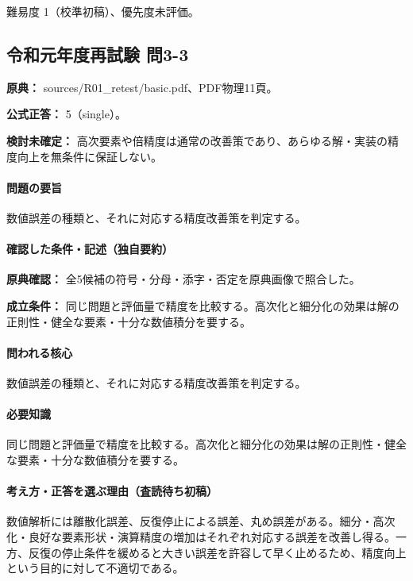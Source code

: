 \par 難易度 1（校準初稿）、優先度未評価。

\subsection{令和元年度再試験 問3-3}
\label{q:r01-ret-basic-3-3}

\noindent\textbf{原典：} sources/R01\_retest/basic.pdf、PDF物理11頁。

\textbf{公式正答：} 5（single）。

\par\textbf{検討未確定：} 高次要素や倍精度は通常の改善策であり、あらゆる解・実装の精度向上を無条件に保証しない。

\paragraph{問題の要旨} 数値誤差の種類と、それに対応する精度改善策を判定する。

\paragraph{確認した条件・記述（独自要約）}\mbox{}\par

\noindent\textbf{原典確認：} 全5候補の符号・分母・添字・否定を原典画像で照合した。\par

\noindent\textbf{成立条件：} 同じ問題と評価量で精度を比較する。高次化と細分化の効果は解の正則性・健全な要素・十分な数値積分を要する。\par

\paragraph{問われる核心} 数値誤差の種類と、それに対応する精度改善策を判定する。

\paragraph{必要知識} 同じ問題と評価量で精度を比較する。高次化と細分化の効果は解の正則性・健全な要素・十分な数値積分を要する。

\paragraph{考え方・正答を選ぶ理由（査読待ち初稿）} 数値解析には離散化誤差、反復停止による誤差、丸め誤差がある。細分・高次化・良好な要素形状・演算精度の増加はそれぞれ対応する誤差を改善し得る。一方、反復の停止条件を緩めると大きい誤差を許容して早く止めるため、精度向上という目的に対して不適切である。

